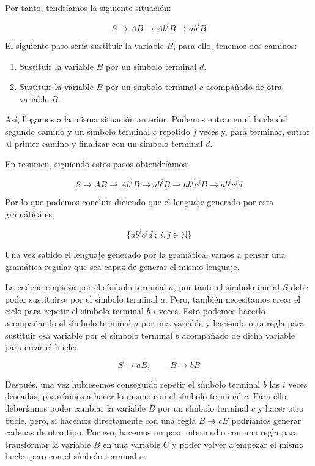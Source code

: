 \documentclass[10pt,a4paper,spanish]{report}
\begin{document}
Por tanto, tendríamos la siguiente situación:

\begin{displaymath}
S \rightarrow AB \rightarrow Ab^iB \rightarrow ab^iB
\end{displaymath}

El siguiente paso sería sustituir la variable $B$, para ello, tenemos dos caminos:
\begin{enumerate}[\color{p6}{$\bigstar$}]
  \item Sustituir la variable $B$ por un símbolo terminal $d$.
  \item Sustituir la variable $B$ por un símbolo terminal $c$ acompañado de otra variable $B$.
\end{enumerate}

Así, llegamos a la misma situación anterior. Podemos entrar en el bucle del segundo camino y un símbolo terminal $c$ repetido $j$ veces y, para terminar, entrar al primer camino y finalizar con un símbolo terminal $d$.

En resumen, siguiendo estos pasos obtendríamos:

\begin{displaymath}
S \rightarrow AB \rightarrow Ab^iB \rightarrow ab^iB \rightarrow ab^ic^jB \rightarrow ab^ic^jd
\end{displaymath}

Por lo que podemos concluir diciendo que el lenguaje generado por esta gramática es:

\begin{equation*}
\{ab^ic^jd ~:~ i, j \in \mathbb{N}\}
\end{equation*}

Una vez sabido el lenguaje generado por la gramática, vamos a pensar una gramática regular que sea capaz de generar el mismo lenguaje.

La cadena empieza por el símbolo terminal $a$, por tanto el símbolo inicial $S$ debe poder sustituirse por el símbolo terminal $a$. Pero, también necesitamos crear el ciclo para repetir el símbolo terminal $b$ $i$ veces. Esto podemos hacerlo acompañando el símbolo terminal $a$ por una variable y haciendo otra regla para sustituir esa variable por el símbolo terminal $b$ acompañado de dicha variable para crear el bucle:

\begin{displaymath}
S \rightarrow aB, \qquad\ B \rightarrow bB
\end{displaymath}

Después, una vez hubiesemos conseguido repetir el símbolo terminal $b$ las $i$ veces deseadas, pasaríamos a hacer lo mismo con el símbolo terminal $c$. Para ello, deberíamos poder cambiar la variable $B$ por un símbolo terminal $c$ y hacer otro bucle, pero, si hacemos directamente con una regla $B \rightarrow cB$  podríamos generar cadenas de otro tipo. Por eso, hacemos un paso intermedio con una regla para transformar la variable $B$ en una variable $C$ y poder volver a empezar el mismo bucle, pero con el símbolo terminal $c$:
\end{document}

